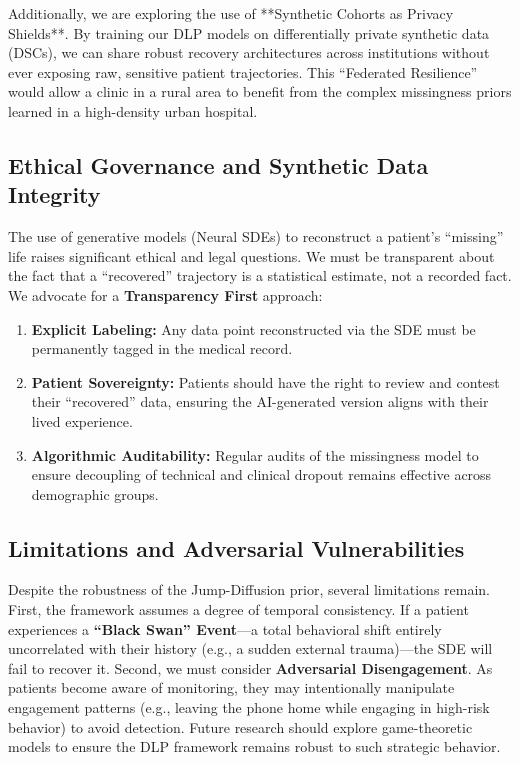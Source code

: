 Additionally, we are exploring the use of **Synthetic Cohorts as Privacy Shields**. By training our DLP models on differentially private synthetic data (DSCs), we can share robust recovery architectures across institutions without ever exposing raw, sensitive patient trajectories. This ``Federated Resilience'' would allow a clinic in a rural area to benefit from the complex missingness priors learned in a high-density urban hospital.

\subsection{Ethical Governance and Synthetic Data Integrity}
The use of generative models (Neural SDEs) to reconstruct a patient's ``missing'' life raises significant ethical and legal questions. We must be transparent about the fact that a ``recovered'' trajectory is a statistical estimate, not a recorded fact. We advocate for a \textbf{Transparency First} approach:
\begin{enumerate}
    \item \textbf{Explicit Labeling:} Any data point reconstructed via the SDE must be permanently tagged in the medical record.
    \item \textbf{Patient Sovereignty:} Patients should have the right to review and contest their ``recovered'' data, ensuring the AI-generated version aligns with their lived experience.
    \item \textbf{Algorithmic Auditability:} Regular audits of the missingness model to ensure decoupling of technical and clinical dropout remains effective across demographic groups.
\end{enumerate}

\subsection{Limitations and Adversarial Vulnerabilities}
Despite the robustness of the Jump-Diffusion prior, several limitations remain. First, the framework assumes a degree of temporal consistency. If a patient experiences a \textbf{``Black Swan'' Event}—a total behavioral shift entirely uncorrelated with their history (e.g., a sudden external trauma)—the SDE will fail to recover it. Second, we must consider \textbf{Adversarial Disengagement}. As patients become aware of monitoring, they may intentionally manipulate engagement patterns (e.g., leaving the phone home while engaging in high-risk behavior) to avoid detection. Future research should explore game-theoretic models to ensure the DLP framework remains robust to such strategic behavior.


